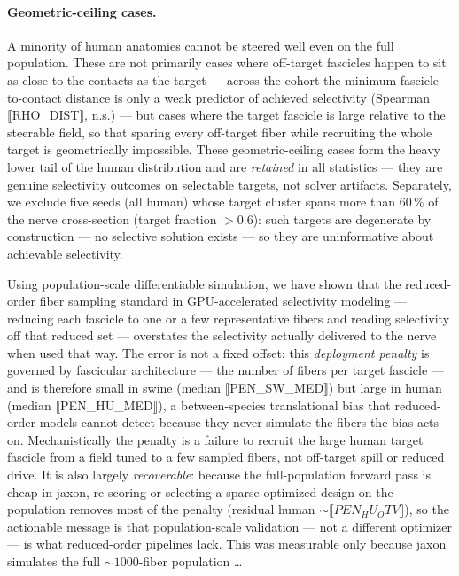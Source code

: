 \paragraph{Geometric-ceiling cases.}
A minority of human anatomies cannot be steered well even on the full
population.  These are not primarily cases where off-target fascicles happen to
sit as close to the contacts as the target --- across the cohort the minimum
fascicle-to-contact distance is only a weak predictor of achieved selectivity
(Spearman ⟦RHO_DIST⟧, n.s.) --- but cases where the target fascicle is large
relative to the steerable field, so that sparing every off-target fiber while
recruiting the whole target is geometrically impossible.  These
geometric-ceiling cases form the heavy lower tail of the human distribution and
are \emph{retained} in all statistics --- they are genuine selectivity outcomes
on selectable targets, not solver artifacts.  Separately, we exclude five seeds
(all human) whose target cluster spans more than $60\,\%$ of the nerve
cross-section (target fraction $> 0.6$): such targets are degenerate by
construction --- no selective solution exists --- so they are uninformative
about achievable selectivity.

Using population-scale differentiable simulation, we have shown that the
reduced-order fiber sampling standard in GPU-accelerated selectivity modeling
--- reducing each fascicle to one or a few representative fibers and reading
selectivity off that reduced set --- overstates the selectivity actually
delivered to the nerve when used that way.  The error is not a fixed offset:
this \emph{deployment penalty} is governed by fascicular architecture --- the
number of fibers per target fascicle --- and is therefore small in swine
(median ⟦PEN_SW_MED⟧) but large in human (median ⟦PEN_HU_MED⟧), a
between-species translational bias that reduced-order models cannot detect
because they never simulate the fibers the bias acts on.  Mechanistically the
penalty is a failure to recruit the large human target fascicle from a field
tuned to a few sampled fibers, not off-target spill or reduced drive.  It is
also largely \emph{recoverable}: because the full-population forward pass is
cheap in jaxon, re-scoring or selecting a sparse-optimized design on the
population removes most of the penalty (residual human ${\sim}⟦PEN_HU_OTV⟧$),
so the actionable message is that population-scale validation --- not a
different optimizer --- is what reduced-order pipelines lack.  This was
measurable only because jaxon simulates the full ${\sim}1000$-fiber population
\dots

